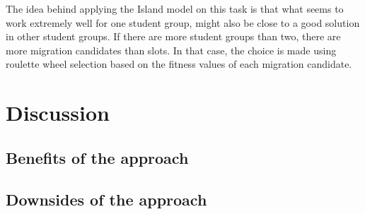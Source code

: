 The idea behind applying the Island model on this task is that what seems to work
extremely well for one student group, might also be close to a good solution in
other student groups. If there are more student groups than two, there are more
migration candidates than slots. In that case, the choice is made using
roulette wheel selection based on the fitness values of each migration
candidate.
\section{Discussion}
\label{sec:approach_discussion}
\subsection{Benefits of the approach}

\subsection{Downsides of the approach}
